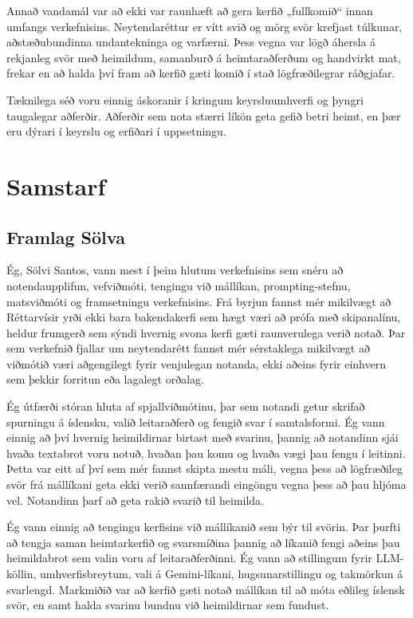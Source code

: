\documentclass[fleqn]{report}
\begin{document}
Annað vandamál var að ekki var raunhæft að gera kerfið „fullkomið“ innan umfangs verkefnisins. Neytendaréttur er vítt svið og mörg svör krefjast túlkunar, aðstæðubundinna undantekninga og varfærni. Þess vegna var lögð áhersla á rekjanleg svör með heimildum, samanburð á heimtaraðferðum og handvirkt mat, frekar en að halda því fram að kerfið gæti komið í stað lögfræðilegrar ráðgjafar.

Tæknilega séð voru einnig áskoranir í kringum keyrsluumhverfi og þyngri taugalegar aðferðir. Aðferðir sem nota stærri líkön geta gefið betri heimt, en þær eru dýrari í keyrslu og erfiðari í uppsetningu.

\section{Samstarf}
\subsection{Framlag Sölva}

Ég, Sölvi Santos, vann mest í þeim hlutum verkefnisins sem snéru að notendaupplifun, vefviðmóti, tengingu við mállíkan, prompting-stefnu, matsviðmóti og framsetningu verkefnisins. Frá byrjun fannst mér mikilvægt að Réttarvísir yrði ekki bara bakendakerfi sem hægt væri að prófa með skipanalínu, heldur frumgerð sem sýndi hvernig svona kerfi gæti raunverulega verið notað. Þar sem verkefnið fjallar um neytendarétt fannst mér sérstaklega mikilvægt að viðmótið væri aðgengilegt fyrir venjulegan notanda, ekki aðeins fyrir einhvern sem þekkir forritun eða lagalegt orðalag.

Ég útfærði stóran hluta af spjallviðmótinu, þar sem notandi getur skrifað spurningu á íslensku, valið leitaraðferð og fengið svar í samtalsformi. Ég vann einnig að því hvernig heimildirnar birtast með svarinu, þannig að notandinn sjái hvaða textabrot voru notuð, hvaðan þau komu og hvaða vægi þau fengu í leitinni. Þetta var eitt af því sem mér fannst skipta mestu máli, vegna þess að lögfræðileg svör frá mállíkani geta ekki verið sannfærandi eingöngu vegna þess að þau hljóma vel. Notandinn þarf að geta rakið svarið til heimilda.

Ég vann einnig að tengingu kerfisins við mállíkanið sem býr til svörin. Þar þurfti að tengja saman heimtarkerfið og svarsmíðina þannig að líkanið fengi aðeins þau heimildabrot sem valin voru af leitaraðferðinni. Ég vann að stillingum fyrir LLM-köllin, umhverfisbreytum, vali á Gemini-líkani, hugsunarstillingu og takmörkun á svarlengd. Markmiðið var að kerfið gæti notað mállíkan til að móta eðlileg íslensk svör, en samt halda svarinu bundnu við heimildirnar sem fundust.
\end{document}
